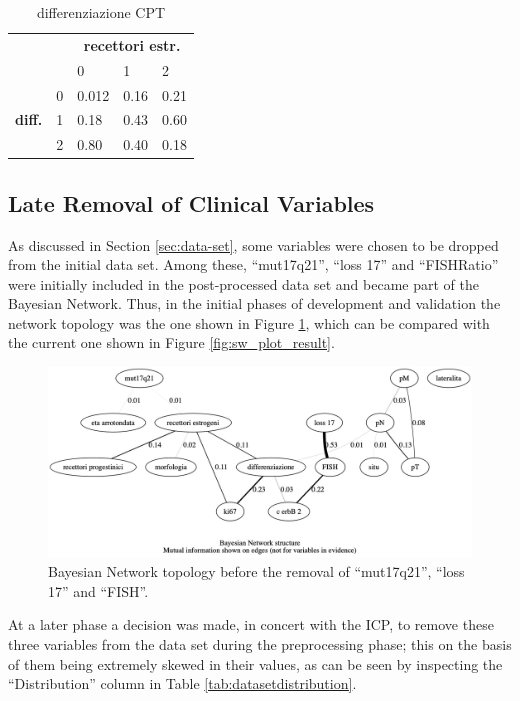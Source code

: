 \begin{table}[htbp]
\centering
\caption{differenziazione CPT}
\begin{tabularx}{0.5\textwidth}{ccXXX}
\toprule
      & &  \multicolumn{3}{c}{\textbf{recettori estr.}} \\
\cmidrule(lr){3-5}
 & & 0 & 1 & 2   \\ 
 \multirow{3}{*}{\textbf{diff.}}  & 0 & 0.012 & 0.16 & 0.21  \\
 & 1 & 0.18 & 0.43 & 0.60    \\
 & 2 & 0.80 & 0.40 & 0.18 \\
\bottomrule
\end{tabularx}
\label{tab:diff-cpd-issues}
\end{table}

\subsection{Late Removal of Clinical Variables} \label{subsec:removal-clinical-variables}
As discussed in Section \ref{sec:data-set}, some variables were chosen to be dropped from the initial data set.
Among these, \enquote{mut17q21}, \enquote{loss 17} and \enquote{FISHRatio} were initially included in the post-processed data set and became part of the Bayesian Network.
Thus, in the initial phases of development and validation the network topology was the one shown in Figure \ref{fig:old-bn-plot}, which can be compared with the current one shown in Figure \ref{fig:sw_plot_result}.

\begin{figure}[htbp]
\centerline{\includegraphics[width=\textwidth]{results/images/old-bn-plot}}
\caption{Bayesian Network topology before the removal of \enquote{mut17q21}, \enquote{loss 17} and \enquote{FISH}.}
\label{fig:old-bn-plot}
\end{figure}

At a later phase a decision was made, in concert with the ICP, to remove these three variables from the data set during the preprocessing phase; this on the basis of them being extremely skewed in their values, as can be seen by inspecting the \enquote{Distribution} column in Table \ref{tab:datasetdistribution}.

